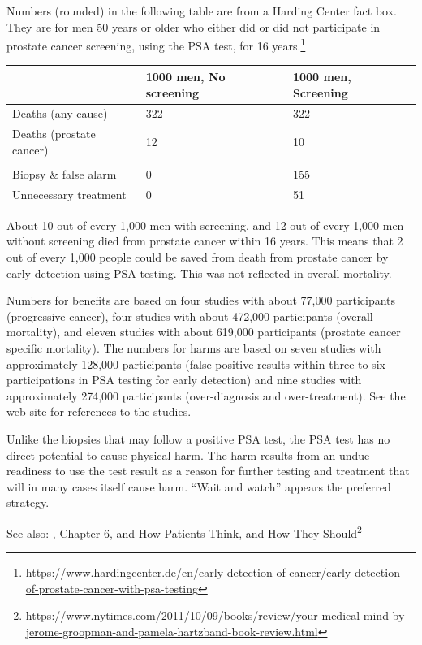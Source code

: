 \documentclass[
  10pt,
  b5paper]{book}
\begin{document}
Numbers (rounded) in the following table are from a Harding Center
fact box. They are for men 50 years or older who either did or did not
participate in prostate cancer screening, using the PSA test, for 16 years.\footnote{\url{https://www.hardingcenter.de/en/early-detection-of-cancer/early-detection-of-prostate-cancer-with-psa-testing}}

\begin{longtable}[]{@{}lll@{}}
\toprule
& 1000 men, No screening & 1000 men, Screening \\
\midrule
\endhead
Deaths (any cause) & 322 & 322 \\
Deaths (prostate cancer) & 12 & 10 \\
& & \\
Biopsy \& false alarm & 0 & 155 \\
Unnecessary treatment & 0 & 51 \\
\bottomrule
\end{longtable}

About 10 out of every 1,000 men with screening, and 12 out of every 1,000 men without screening died from prostate cancer within 16 years. This means that 2 out of every 1,000 people could be saved from death from prostate cancer by early detection using PSA testing. This was not reflected in overall mortality.

Numbers for benefits are based on four studies with about 77,000 participants (progressive cancer), four studies with about 472,000 participants (overall mortality), and eleven studies with about 619,000 participants (prostate cancer specific mortality). The numbers for harms are based on seven studies with approximately 128,000 participants (false-positive results within three to six participations in PSA testing for early detection) and nine studies with approximately 274,000 participants (over-diagnosis and over-treatment). See
the web site for references to the studies.

Unlike the biopsies that may follow a positive PSA test, the PSA test has
no direct potential to cause physical harm. The harm results from an
undue readiness to use the test result as a reason for further testing
and treatment that will in many cases itself cause harm. ``Wait and watch''
appears the preferred strategy.

See also: \citet{levitin_2015}, Chapter 6, and
\href{https://www.nytimes.com/2011/10/09/books/review/your-medical-mind-by-jerome-groopman-and-pamela-hartzband-book-review.html}{How Patients Think, and How They Should}\footnote{\url{https://www.nytimes.com/2011/10/09/books/review/your-medical-mind-by-jerome-groopman-and-pamela-hartzband-book-review.html}}
\end{document}
